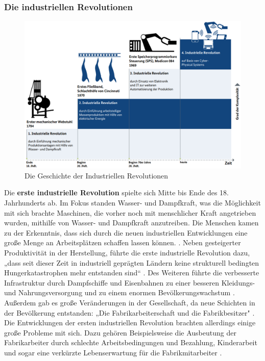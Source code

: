 \subsubsection{Die industriellen Revolutionen}\label{sec:IndustrielleRevolution}
\begin{figure}[h]
	\centering
	\includegraphics[width=1\linewidth]{Bilder/A1_DieGeschichteDerIndustriellenRevolutionenBMWI}
	\caption{Die Geschichte der Industriellen Revolutionen \cite[S.8]{A1}}
	\label{fig:IndustrielleRevolutionenBild}
\end{figure}
\FloatBarrier
\noindent Die \textbf{erste industrielle Revolution} spielte sich Mitte bis Ende des 18. Jahrhunderts ab. Im Fokus standen Wasser- und Dampfkraft, was die Möglichkeit mit sich brachte Maschinen, die vorher noch mit menschlicher Kraft angetrieben wurden, mithilfe von Wasser- und Dampfkraft anzutreiben. Die Menschen kamen zu der Erkenntnis, dass sich durch die neuen industriellen Entwicklungen eine große Menge an Arbeitsplätzen schaffen lassen können. \cite{9}. Neben gesteigerter Produktivität in der Herstellung, führte die erste industrielle Revolution dazu, „dass seit dieser Zeit in industriell geprägten Ländern keine strukturell bedingten Hungerkatastrophen mehr entstanden sind“ \cite[S.5]{15}. Des Weiteren führte die verbesserte Infrastruktur durch Dampfschiffe und Eisenbahnen zu einer besseren Kleidungs- und Nahrungsversorgung und zu einem enormen Bevölkerungswachstum \cite[S.5]{15}. Außerdem gab es große Veränderungen in der Gesellschaft, da neue Schichten in der Bevölkerung entstanden: „Die Fabrikarbeiterschaft und die Fabrikbesitzer" \cite[S.5]{15}. Die Entwicklungen der ersten industriellen Revolution brachten allerdings einige große Probleme mit sich. Dazu gehören Beispielsweise die Ausbeutung der Fabrikarbeiter durch schlechte Arbeitsbedingungen und Bezahlung, Kinderarbeit und sogar eine verkürzte Lebenserwartung für die Fabrikmitarbeiter \cite[S.5]{15}.
